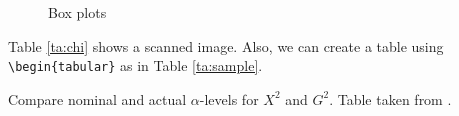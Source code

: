 \documentclass[12pt]{article}
\begin{document}
\begin{figure}[htbp] \caption{Box plots}  %
\label{fig:boxplot}
\vspace*{-2in}
\end{figure}


\newpage
Table \ref{ta:chi} shows a scanned image.  Also, we can create a table using \verb#\begin{tabular}# as in Table \ref{ta:sample}.

\begin{table}[htbp]
\begin{center}
\caption{Compare nominal and actual $\alpha$-levels for $X^2$ and $G^2$. Table taken from \cite{Fag13}.}
\vspace{.2in}
\label{ta:chi}
\end{center}
\end{table}
\end{document}
